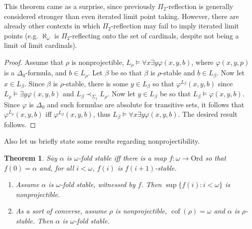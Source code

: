 \documentclass{article}
\newcommand{\Ord}{\mathrm{Ord}}
\theoremstyle{definition}
\theoremstyle{plain}
\newtheorem{theorem}[definition]{Theorem}
\theoremstyle{plain}
\theoremstyle{plain}
\theoremstyle{plain}
\theoremstyle{remark}
\theoremstyle{remark}
\theoremstyle{remark}
\theoremstyle{plain}
\theoremstyle{plain}
\theoremstyle{plain}
\begin{document}
This theorem came as a surprise, since previously $\Pi_2$-reflection is generally considered stronger than even iterated limit point taking. However, there are already other contexts in which $\Pi_2$-reflection may fail to imply iterated limit points (e.g. $\aleph_\omega$ is $\Pi_2$-reflecting onto the set of cardinals, despite not being a limit of limit cardinals).

\begin{proof}
Assume that $\rho$ is nonprojectible, $L_\rho \models \forall x \exists y \varphi(x,y,b)$, where $\varphi(x,y,p)$ is a $\Delta_0$-formula, and $b \in L_\rho$. Let $\beta$ be so that $\beta$ is $\rho$-stable and $b \in L_\beta$. Now let $x \in L_\beta$. Since $\beta$ is $\rho$-stable, there is some $y \in L_\beta$ so that $\varphi^{L_\beta}(x,y,b)$ since $L_\rho \models \exists y \varphi(x,y,b)$ and $L_\beta \prec_{\Sigma_1} L_\rho$. Now let $y \in L_\beta$ be so that $L_\beta \models \varphi(x,y,b)$. Since $\varphi$ is $\Delta_0$ and such formulae are absolute for transitive sets, it follows that $\varphi^{L_\rho}(x,y,b)$ iff $\varphi^{L_\beta}(x,y,b)$, thus $L_\beta \models \forall x \exists y \varphi(x,y,b)$. The desired result follows.
\end{proof}

Also let us briefly state some results regarding nonprojectibility.

\begin{theorem}
Say $\alpha$ is $\omega$-fold stable iff there is a map $f: \omega \to \Ord$ so that $f(0) = \alpha$ and, for all $i < \omega$, $f(i)$ is $f(i+1)$-stable.

\begin{enumerate}
    \item Assume $\alpha$ is $\omega$-fold stable, witnessed by $f$. Then $\sup\{f(i): i < \omega\}$ is nonprojectible.
    \item As a sort of converse, assume $\rho$ is nonprojectible, $\operatorname{cof}(\rho) = \omega$ and $\alpha$ is $\rho$-stable. Then $\alpha$ is $\omega$-fold stable.
\end{enumerate}
\end{theorem}
\end{document}
